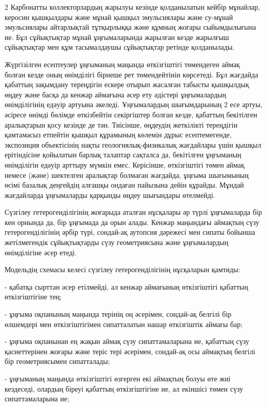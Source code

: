 \begin{multicols}{2}
Карбонатты коллекторлардың жарылуы кезінде қолданылатын кейбір мұнайлар,
керосин қышқылдары және мұнай қышқыл эмульсиялары және су-мұнай
эмульсиялары айтарлықтай тұтқырлыққа және құмның жоғары сыйымдылығына
ие. Бұл сұйықтықтар мұнай ұңғымаларында жарылған кезде жарылғыш
сұйықтықтар мен құм тасымалдаушы сұйықтықтар ретінде қолданылады.

Жүргізілген есептеулер ұңғыманың маңында өткізгіштігі төмендеген аймақ
болған кезде оның өнімділігі бірнеше рет төмендейтінін көрсетеді. Бұл
жағдайда қабаттың зақымдану тереңдігін ескере отырып жасалған табысты
қышқылдық өңдеу және басқа да кенжар аймағына әсер ету әдістері
ұңғымалардың өнімділігінің едәуір артуына әкеледі. Ұңғымалардың
шығымдарының 2 есе артуы, әсіресе өнімді бөлімде өткізбейтін секіргіштер
болған кезде, қабаттың бекітілген аралықтарын қосу кезінде де тән.
Тиісінше, өңдеудің жеткілікті тереңдігін қамтамасыз етпейтін қышқыл
құрамының көлемін дұрыс есептемегенде, экспозиция объектісінің нақты
геологиялық-физикалық жағдайлары үшін қышқыл ерітіндісіне қойылатын
барлық талаптар сақталса да, бекітілген ұңғыманың өнімділігін едәуір
арттыру мүмкін емес. Керісінше, өткізгіштігі төмен аймақ немесе (және)
шектелген аралықтар болмаған жағдайда, ұңғыма шығымының өсімі базалық
деңгейдің алғашқы ондаған пайызына дейін құрайды. Мұндай жағдайларда
ұңғымаларды қарқынды өңдеу шығындары өтелмейді.

Сүзгілеу гетерогенділігінің жоғарыда аталған нұсқалары әр түрлі
ұңғымаларда бір кен орнында да, бір ұңғымада да орын алады. Кенжар
маңындағы аймақтың сүзу гетерогенділігінің әрбір түрі, сондай-ақ
аутопсия дәрежесі мен сипаты бойынша жетілмегендік сұйықтықтарды сүзу
геометриясына және ұңғымалардың өнімділігіне әсер етеді.

Модельдің схемасы келесі сүзгілеу гетерогенділігінің нұсқаларын қамтиды:

- қабатқа сырттан әсер етілмейді, ал кенжар аймағының өткізгіштігі
қабаттың өткізгіштігіне тең;

- ұңғыма оқпанының маңында терінің оң әсерімен, сондай-ақ белгілі бір
өлшемдері мен өткізгіштігімен сипатталатын нашар өткізгіштік аймағы бар;

- ұңғыма оқпанынан ең жақын аймақ сүзу сипаттамаларына ие, қабаттың сүзу
қасиеттерінен жоғары және теріс тері әсерімен, сондай-ақ осы аймақтың
белгілі бір геометриясымен сипатталады;

- ұңғыманың маңында өткізгіштігі өзгерген екі аймақтың болуы өте жиі
кездеседі, олардың біреуі қабаттың өткізгіштігіне ие, ал екіншісі төмен
сүзу сипаттамаларына ие;


\end{multicols}
